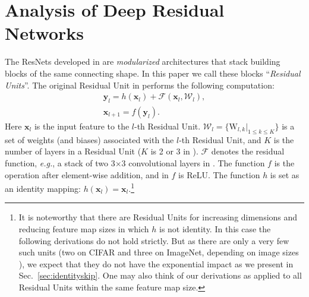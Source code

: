 \documentclass[runningheads]{llncs}
\def\eg{\emph{e.g.}}
\newcommand{\ve}[1]{\mathbf{#1}} \newcommand{\ma}[1]{\mathrm{#1}}
\begin{document}
\section{Analysis of Deep Residual Networks}

The ResNets developed in \cite{He2016} are \emph{modularized} architectures that stack building blocks of the same connecting shape. In this paper we call these blocks ``\emph{Residual Units}''. The original Residual Unit in \cite{He2016} performs the following computation:
\begin{gather}
\ve{y}_{l} = h(\ve{x}_{l}) + \mathcal{F}(\ve{x}_{l}, \mathcal{W}_l), \label{eq:resunit1}\\
\ve{x}_{l+1} = f(\ve{y}_{l}) \label{eq:resunit2}.
\end{gather}
Here $\ve{x}_{l}$ is the input feature to the $l$-th Residual Unit. $\mathcal{W}_l=\{\ma{W}_{l,k} | _{1\leq k \leq K}\}$ is a set of weights (and biases) associated with the $l$-th Residual Unit, and $K$ is the number of layers in a Residual Unit ($K$ is 2 or 3 in \cite{He2016}). $\mathcal{F}$ denotes the residual function, \eg, a stack of two 3$\times$3 convolutional layers in \cite{He2016}. The function $f$ is the operation after element-wise addition, and in \cite{He2016} $f$ is ReLU. The function $h$ is set as an identity mapping: $h(\ve{x}_{l}) = \ve{x}_{l}$.\footnote{It is noteworthy that there are Residual Units for increasing dimensions and reducing feature map sizes \cite{He2016} in which $h$ is not identity.
In this case the following derivations do not hold strictly. But as there are only a very few such units (two on CIFAR and three on ImageNet, depending on image sizes \cite{He2016}), we expect that they do not have the exponential impact as we present in Sec.~\ref{sec:identityskip}. One may also think of our derivations as applied to all Residual Units within the same feature map size.}
\end{document}
